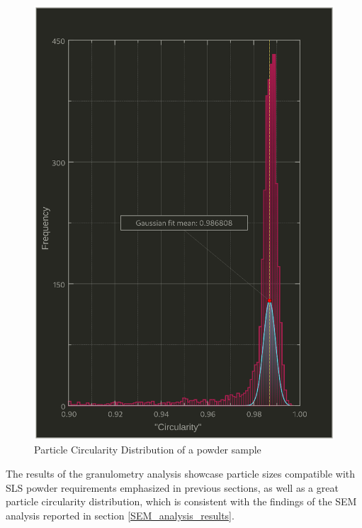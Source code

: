 \documentclass[a4paper]{article}
\begin{document}
        \begin{figure}[ht]
            \centering
            \includegraphics[width=\textwidth]{Pictures/Granulometry_plots/Histogram_Circularity.eps}
            \caption{Particle Circularity Distribution of a powder sample}
            \label{fig:circularity_distribution}
        \end{figure}
  
      \clearpage
  
      The results of the granulometry analysis showcase particle sizes compatible with SLS powder requirements emphasized in previous sections, 
      as well as a great particle circularity distribution, which is consistent with the findings of the 
      SEM analysis reported in section \ref{SEM_analysis_results}. \\
  
\end{document}
